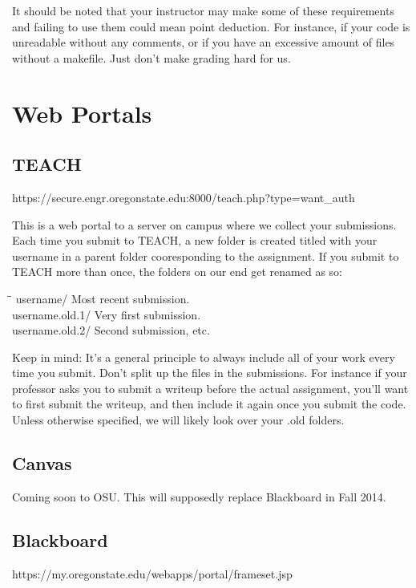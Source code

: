\documentclass[letterpaper,10pt,titlepage,fleqn]{article}
\begin{document}
It should be noted that your instructor may make some of these requirements and 
failing to use them could mean point deduction. For instance, if your code is
unreadable without any comments, or if you have an excessive amount of files
without a makefile. Just don’t make grading hard for us.




\section{Web Portals}


\subsection{TEACH}
https://secure.engr.oregonstate.edu:8000/teach.php?type=want\_auth

This is a web portal to a server on campus where we collect your submissions. Each
time you submit to TEACH, a new folder is created titled with your username in a
 parent folder cooresponding to the assignment. If you submit to TEACH more than once, the folders
on our end get renamed as so:

\begin{tabbing}
\hspace*{2cm}\=\hspace*{3cm}\= \kill
username/ 		\>\> Most recent submission. \\
username.old.1/ \>\> Very first submission. \\
username.old.2/ \>\> Second submission, etc. \\
\end{tabbing}

Keep in mind: It’s a general principle to always include all of your work every
time you submit. Don’t split up the files in the submissions. For instance if
your professor asks you to submit a writeup before the actual assignment, you'll
want to first submit the writeup, and then include it again once you submit the
code. Unless otherwise specified, we will likely look over your .old folders.


\subsection{Canvas}
Coming soon to OSU. This will supposedly replace Blackboard in Fall 2014. 


\subsection{Blackboard}
https://my.oregonstate.edu/webapps/portal/frameset.jsp
\end{document}
